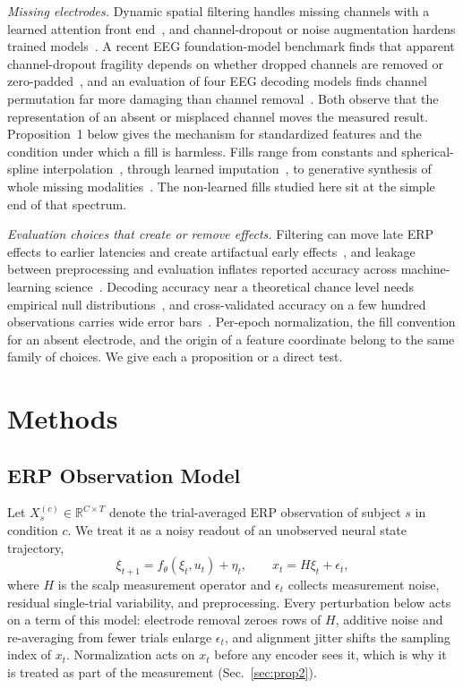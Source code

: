 \documentclass[journal]{IEEEtran}
\newcommand{\R}{\mathbb{R}}
\begin{document}
\emph{Missing electrodes.} Dynamic spatial filtering handles missing channels with a learned attention front end~\cite{banville2022dsf}, and channel-dropout or noise augmentation hardens trained models~\cite{rommel2022augment}. A recent EEG foundation-model benchmark finds that apparent channel-dropout fragility depends on whether dropped channels are removed or zero-padded~\cite{sirca2026beyond}, and an evaluation of four EEG decoding models finds channel permutation far more damaging than channel removal~\cite{wang2026evaluation}. Both observe that the representation of an absent or misplaced channel moves the measured result. Proposition~1 below gives the mechanism for standardized features and the condition under which a fill is harmless. Fills range from constants and spherical-spline interpolation~\cite{perrin1989spherical}, through learned imputation~\cite{banville2022dsf}, to generative synthesis of whole missing modalities~\cite{bi2024graymatters,hu2025gmldm}. The non-learned fills studied here sit at the simple end of that spectrum.

\emph{Evaluation choices that create or remove effects.} Filtering can move late ERP effects to earlier latencies and create artifactual early effects~\cite{acunzo2012systematic,tanner2015inappropriate,vanrullen2011four}, and leakage between preprocessing and evaluation inflates reported accuracy across machine-learning science~\cite{kriegeskorte2009circular,kapoor2023leakage}. Decoding accuracy near a theoretical chance level needs empirical null distributions~\cite{combrisson2015exceeding}, and cross-validated accuracy on a few hundred observations carries wide error bars~\cite{varoquaux2018cross}. Per-epoch normalization, the fill convention for an absent electrode, and the origin of a feature coordinate belong to the same family of choices. We give each a proposition or a direct test.

\section{Methods}
\label{sec:methods}
\subsection{ERP Observation Model}
Let $X_s^{(c)}\in\R^{C\times T}$ denote the trial-averaged ERP observation of subject $s$ in condition $c$. We treat it as a noisy readout of an unobserved neural state trajectory,
\begin{equation}\label{eq:obs}
    \xi_{t+1}=f_\theta(\xi_t,u_t)+\eta_t,\qquad
    x_t=H\xi_t+\epsilon_t,
\end{equation}
where $H$ is the scalp measurement operator and $\epsilon_t$ collects measurement noise, residual single-trial variability, and preprocessing. Every perturbation below acts on a term of this model: electrode removal zeroes rows of $H$, additive noise and re-averaging from fewer trials enlarge $\epsilon_t$, and alignment jitter shifts the sampling index of $x_t$. Normalization acts on $x_t$ before any encoder sees it, which is why it is treated as part of the measurement (Sec.~\ref{sec:prop2}).
\end{document}

